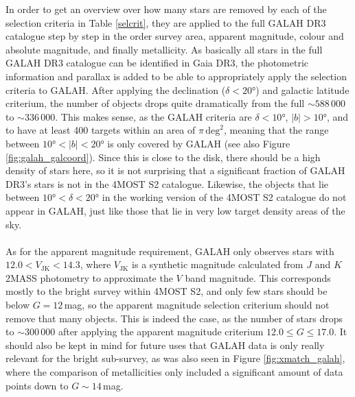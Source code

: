 \documentclass[a4paper,11pt]{article}
\begin{document}
%
In order to get an overview over how many stars are removed by each of the selection criteria in Table \ref{selcrit}, they are applied to the full GALAH DR3 catalogue step by step in the order survey area, apparent magnitude, colour and absolute magnitude, and finally metallicity. As basically all stars in the full GALAH DR3 catalogue can be identified in Gaia DR3, the photometric information and parallax is added to be able to appropriately apply the selection criteria to GALAH. After applying the declination ($\delta<20$°) and galactic latitude criterium, the number of objects drops quite dramatically from the full ${\sim}588\,000$ to ${\sim}336\,000$. This makes sense, as the GALAH criteria are $\delta<10$°, $|b|>10$°, and to have at least 400 targets within an area of $\pi\,\mathrm{deg}^2$, meaning that the range between $10$°$<|b|<20$° is only covered by GALAH (see also Figure \ref{fig:galah_galcoord}). Since this is close to the disk, there should be a high density of stars here, so it is not surprising that a significant fraction of GALAH DR3's stars is not in the 4MOST S2 catalogue. Likewise, the objects that lie between $10$°$<\delta<20$° in the working version of the 4MOST S2 catalogue do not appear in GALAH, just like those that lie in very low target density areas of the sky.\\ \\
%
As for the apparent magnitude requirement, GALAH only observes stars with $12.0<V_\mathrm{JK}<14.3$, where $V_\mathrm{JK}$ is a synthetic magnitude calculated from $J$ and $K$ 2MASS photometry to approximate the $V$ band magnitude. This corresponds mostly to the bright survey within 4MOST S2, and only few stars should be below $G=12$\,mag, so the apparent magnitude selection criterium should not remove that many objects. This is indeed the case, as the number of stars drops to ${\sim}300\,000$ after applying the apparent magnitude criterium $12.0\leq G\leq17.0$. It should also be kept in mind for future uses that GALAH data is only really relevant for the bright sub-survey, as was also seen in Figure \ref{fig:xmatch_galah}, where the comparison of metallicities only included a significant amount of data points down to $G\sim14$\,mag.\\ \\
%
\end{document}
